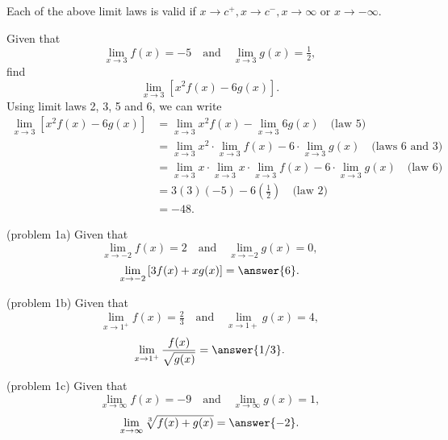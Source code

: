 \documentclass[handout]{ximera}
\begin{document}
Each of the above limit laws is valid if $x \to c^+, x\to c^-, x \to \infty$ or $x \to -\infty$.



\begin{example}[example 1] Given that 
\[
\lim_{x \to 3} f(x) = -5 \quad \text{and} \quad \lim_{x \to 3} g(x) = \tfrac12,
\]
find 
\[
\lim_{x \to 3} \left[x^2f(x) - 6g(x)\right].
\]
Using limit laws 2, 3, 5 and 6, we can write
\begin{align*}
\lim_{x \to 3} \left[x^2f(x) - 6g(x)\right] &= \lim_{x \to 3} x^2 f(x) - \lim_{x \to 3} 6g(x) \quad \text{(law 5)} \\
                                            &= \lim_{x \to 3} x^2 \cdot \lim_{x \to 3}f(x) - 6\cdot\lim_{x \to 3} g(x) \quad \text{(laws 6 and 3)}\\
                                            &= \lim_{x \to 3} x \cdot \lim_{x \to 3} x \cdot \lim_{x \to 3}f(x) - 6\cdot\lim_{x \to 3} g(x) \quad \text{(law 6)}\\
                                            &= 3(3) (-5) - 6(\tfrac12) \quad \text{(law 2)}\\
                                            &= -48.
\end{align*}
\end{example}


\begin{problem}(problem 1a)
Given that 
\[
\lim_{x \to -2} f(x) = 2 \quad \text{and} \quad \lim_{x \to -2} g(x) = 0,
\]
\[
\lim_{x \to -2} \left[3f(x) + xg(x)\right] = \answer{6}.
\]
\end{problem}


\begin{problem}(problem 1b)
Given that 
\[
\lim_{x \to 1^+} f(x) = \tfrac23 \quad \text{and} \quad \lim_{x \to 1+} g(x) = 4,
\]
\[
\lim_{x \to 1^+} \frac{f(x)}{\sqrt{g(x)}} = \answer{1/3}.
\]
\end{problem}


\begin{problem}(problem 1c)
Given that 
\[
\lim_{x \to \infty} f(x) = -9 \quad \text{and} \quad \lim_{x \to \infty} g(x) = 1,
\]
\[
\lim_{x \to \infty} \sqrt[3]{f(x) + g(x)} = \answer{-2}.
\]
\end{problem}


\end{document}

